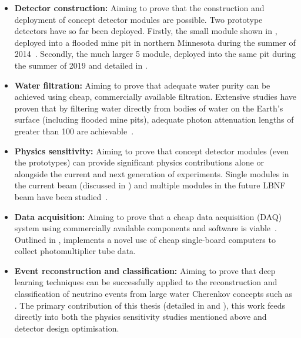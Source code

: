 \begin{itemize}
    \item \textbf{Detector construction:} Aiming to prove that the construction and deployment of
          \chips concept detector modules are possible. Two prototype detectors have so far been
          deployed. Firstly, the small \chipsm module shown in , deployed
          into a flooded mine pit in northern Minnesota during the summer of 2014~\cite{perch2015,
          pfutznerProto2017, pfutzner2017}. Secondly, the much larger \SI{5}{} \chipsfive
          module, deployed into the same pit during the summer of 2019 and detailed in
          .

    \item \textbf{Water filtration:} Aiming to prove that adequate water purity can be achieved
          using cheap, commercially available filtration. Extensive studies have proven that by
          filtering water directly from bodies of water on the Earth's surface (including flooded
          mine pits), adequate photon attenuation lengths of greater than \SI{100}{} are
          achievable~\cite{amat2017, campbell2020}.

    \item \textbf{Physics sensitivity:} Aiming to prove that \chips concept detector modules (even
          the prototypes) can provide significant physics contributions alone or alongside the
          current and next generation of experiments. Single modules in the current \numi beam
          (discussed in ) and multiple modules in the future
          LBNF beam have been studied~\cite{pfutzner2017, adde2016, lang2015}.

    \item \textbf{Data acquisition:} Aiming to prove that a cheap data acquisition (DAQ) system
          using commercially available components and software is viable~\cite{eijk2018}. Outlined
          in , \chips implements a novel use of cheap single-board computers
          to collect photomultiplier tube data.

    \item \textbf{Event reconstruction and classification:} Aiming to prove that deep learning
          techniques can be successfully applied to the reconstruction and classification of
          neutrino events from large water Cherenkov concepts such as \chips. The primary
          contribution of this thesis (detailed in  and
          ), this work feeds directly into both the physics sensitivity
          studies mentioned above and detector design optimisation.
\end{itemize}

